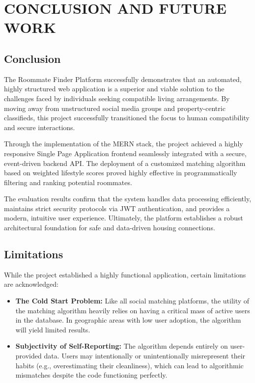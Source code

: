 \documentclass[12pt,a4paper]{report}
\begin{document}
\chapter{CONCLUSION AND FUTURE WORK}

\section{Conclusion}
The Roommate Finder Platform successfully demonstrates that an automated, highly structured web application is a superior and viable solution to the challenges faced by individuals seeking compatible living arrangements. By moving away from unstructured social media groups and property-centric classifieds, this project successfully transitioned the focus to human compatibility and secure interactions.

Through the implementation of the MERN stack, the project achieved a highly responsive Single Page Application frontend seamlessly integrated with a secure, event-driven backend API. The deployment of a customized matching algorithm based on weighted lifestyle scores proved highly effective in programmatically filtering and ranking potential roommates. 

The evaluation results confirm that the system handles data processing efficiently, maintains strict security protocols via JWT authentication, and provides a modern, intuitive user experience. Ultimately, the platform establishes a robust architectural foundation for safe and data-driven housing connections.

\section{Limitations}
While the project established a highly functional application, certain limitations are acknowledged:
\begin{itemize}
    \item \textbf{The Cold Start Problem:} Like all social matching platforms, the utility of the matching algorithm heavily relies on having a critical mass of active users in the database. In geographic areas with low user adoption, the algorithm will yield limited results.
    \item \textbf{Subjectivity of Self-Reporting:} The algorithm depends entirely on user-provided data. Users may intentionally or unintentionally misrepresent their habits (e.g., overestimating their cleanliness), which can lead to algorithmic mismatches despite the code functioning perfectly.
\end{itemize}
\end{document}
